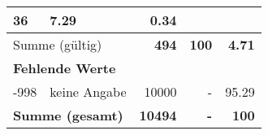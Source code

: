 \begin{longtable}{lXrrr}
       \num{36} &
       \num[round-mode=places,round-precision=2]{7,29} &
         \num[round-mode=places,round-precision=2]{0,34} \\
     \midrule
     \multicolumn{2}{l}{Summe (gültig)} &
       \textbf{\num{494}} &
     \textbf{100} &
       \textbf{\num[round-mode=places,round-precision=2]{4,71}} \\
     \multicolumn{5}{l}{\textbf{Fehlende Werte}}\\
       -998 &
       keine Angabe &
         \num{10000} &
        - &
         \num[round-mode=places,round-precision=2]{95,29} \\
     \midrule
     \multicolumn{2}{l}{\textbf{Summe (gesamt)}} &
          \textbf{\num{10494}} &
        \textbf{-} &
        \textbf{100} \\
     \bottomrule
     \end{longtable}
     
